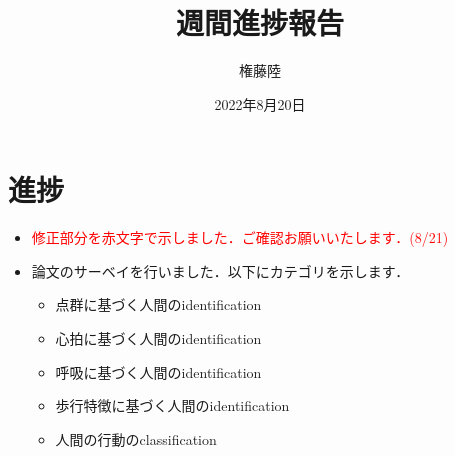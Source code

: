 \documentclass[dvipdfmx]{jsarticle}
\begin{document}
\title{週間進捗報告}
\author{権藤陸}
\date{2022年8月20日}
\maketitle
\section{進捗}
\begin{itemize}
    \item \textcolor{red}{修正部分を赤文字で示しました．ご確認お願いいたします．(8/21)}
    \item 論文のサーベイを行いました．以下にカテゴリを示します．
    \begin{itemize}
        \item 点群に基づく人間のidentification
        \item 心拍に基づく人間のidentification
        \item 呼吸に基づく人間のidentification
        \item 歩行特徴に基づく人間のidentification
        \item 人間の行動のclassification
    \end{itemize}
\end{itemize}
\end{document}
